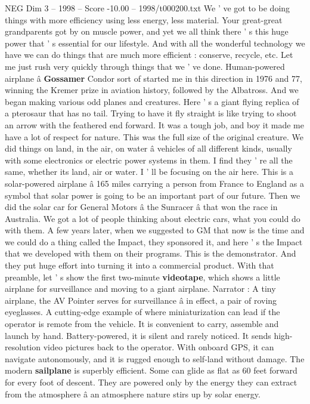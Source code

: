 \begin{textsample}{NEG Dim 3 – 1998 – Score -10.00 – 1998/t000200.txt}
We ' ve got to be doing things with more efficiency using less energy, less material.
Your great-great grandparents got by on muscle power, and yet we all think there ' s this huge power that ' s essential for our lifestyle.
And with all the wonderful technology we have we can do things that are much more efficient : conserve, recycle, etc.
Let me just rush very quickly through things that we ' ve done.
Human-powered airplane â \textbf{Gossamer} Condor sort of started me in this direction in 1976 and 77, winning the Kremer prize in aviation history, followed by the Albatross.
And we began making various odd planes and creatures.
Here ' s a giant flying replica of a pterosaur that has no tail.
Trying to have it fly straight is like trying to shoot an arrow with the feathered end forward.
It was a tough job, and boy it made me have a lot of respect for nature.
This was the full size of the original creature.
We did things on land, in the air, on water â vehicles of all different kinds, usually with some electronics or electric power systems in them.
I find they ' re all the same, whether its land, air or water.
I ' ll be focusing on the air here.
This is a solar-powered airplane â 165 miles carrying a person from France to England as a symbol that solar power is going to be an important part of our future.
Then we did the solar car for General Motors â the Sunracer â that won the race in Australia.
We got a lot of people thinking about electric cars, what you could do with them.
A few years later, when we suggested to GM that now is the time and we could do a thing called the Impact, they sponsored it, and here ' s the Impact that we developed with them on their programs.
This is the demonstrator.
And they put huge effort into turning it into a commercial product.
With that preamble, let ' s show the first two-minute \textbf{videotape}, which shows a little airplane for surveillance and moving to a giant airplane.
Narrator : A tiny airplane, the AV Pointer serves for surveillance â in effect, a pair of roving eyeglasses.
A cutting-edge example of where miniaturization can lead if the operator is remote from the vehicle.
It is convenient to carry, assemble and launch by hand.
Battery-powered, it is silent and rarely noticed.
It sends high-resolution video pictures back to the operator.
With onboard GPS, it can navigate autonomously, and it is rugged enough to self-land without damage.
The modern \textbf{sailplane} is superbly efficient.
Some can glide as flat as 60 feet forward for every foot of descent.
They are powered only by the energy they can extract from the atmosphere â an atmosphere nature stirs up by solar energy.

\end{textsample}
